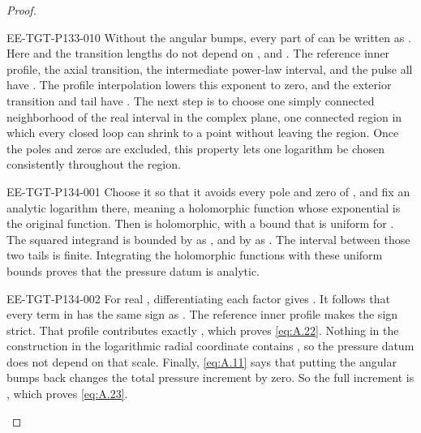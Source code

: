 \begin{proof}
\begin{EESegment}{EE-TGT-P133-010}
Without the angular bumps, every part of  can be written as
. Here  and the transition lengths do not depend
on , and . The reference inner profile, the axial
transition, the intermediate power-law interval, and the pulse all have
. The profile interpolation lowers this exponent to zero, and the exterior transition
and tail have . The next step is to choose one simply connected neighborhood of the
real interval in the complex plane, one connected region in which every closed loop can shrink to a point without
leaving the region. Once the poles and zeros are excluded, this property lets one logarithm be chosen consistently
throughout the region.
\end{EESegment}
%
\begin{EESegment}{EE-TGT-P134-001}
Choose it so that it avoids every pole and zero of , and fix an analytic logarithm there, meaning
a holomorphic function whose exponential is the original function. Then
 is holomorphic, with a bound that is uniform for
. The squared integrand is bounded by
 as , and by
 as . The interval between those two tails is
finite. Integrating the holomorphic functions with these uniform bounds proves that the pressure datum is analytic.
\end{EESegment}

\begin{EESegment}{EE-TGT-P134-002}
For real , differentiating each factor gives
. It follows that every term in
 has the same sign as . The reference inner profile makes the
sign strict. That profile contributes exactly , which proves
\eqref{eq:A.22}. Nothing in the construction in the logarithmic radial coordinate contains
, so the pressure datum does not depend on that scale. Finally, \eqref{eq:A.11} says that putting the
angular bumps back changes the total pressure increment by zero. So the full increment is
, which proves \eqref{eq:A.23}.
\end{EESegment}
\end{proof}

